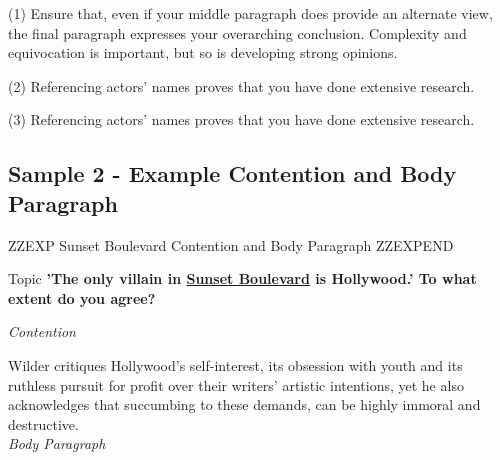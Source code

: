 \documentclass[a4paper]{article}
\begin{document}
(1) Ensure that, even if your middle paragraph does provide an alternate view, the final paragraph expresses your overarching conclusion. Complexity and equivocation is important, but so is developing strong opinions.

(2) Referencing actors’ names proves that you have done extensive research.

(3) Referencing actors’ names proves that you have done extensive research.

\newpage

\subsection{Sample 2 - Example Contention and Body Paragraph}


ZZEXP Sunset Boulevard Contention and Body Paragraph ZZEXPEND



Topic
\textbf{'The only villain in \underline{Sunset Boulevard} is Hollywood.' To what extent do you agree?}


\textit{Contention}

Wilder critiques Hollywood’s self-interest, its obsession with youth and its ruthless pursuit for profit over their writers’ artistic intentions, yet he also acknowledges that succumbing to these demands, can be highly immoral and destructive.\\


\textit{Body Paragraph}
\end{document}
